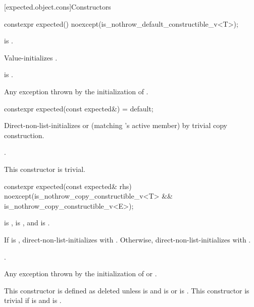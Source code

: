 [expected.object.cons]{Constructors}

%
\begin{itemdecl}
constexpr expected() noexcept(is_nothrow_default_constructible_v<T>);
\end{itemdecl}

\begin{itemdescr}
\pnum
\constraints
{} is .

\pnum
\effects
Value-initializes .

\pnum
\ensures
{} is .

\pnum
\throws
Any exception thrown by the initialization of .
\end{itemdescr}

%
\begin{itemdecl}
constexpr expected(const expected&) = default;
\end{itemdecl}

\begin{itemdescr}
\pnum
\effects
Direct-non-list-initializes  or  (matching 's active member) by trivial copy construction.

\pnum
\ensures
{}.

\pnum
\remarks
This constructor is trivial.
\end{itemdescr}

%
\begin{itemdecl}
constexpr expected(const expected& rhs) noexcept(is_nothrow_copy_constructible_v<T> &&
                                                 is_nothrow_copy_constructible_v<E>);
\end{itemdecl}

\begin{itemdescr}
\pnum
\constraints
{} is ,  is , and  is .

\pnum
\effects
If  is , direct-non-list-initializes  with . Otherwise, direct-non-list-initializes  with .

\pnum
\ensures
{}.

\pnum
\throws
Any exception thrown by the initialization of  or .

\pnum
\remarks
This constructor is defined as deleted unless  is  and  is  or  is . This constructor is trivial if  is  and  is .
\end{itemdescr}

